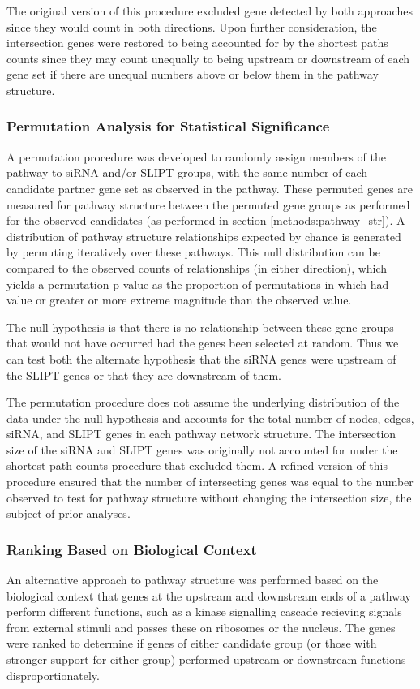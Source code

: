 The original version of this procedure excluded gene detected by both approaches since they would count in both directions. Upon further consideration, the intersection genes were restored to being accounted for by the shortest paths counts since they may count unequally to being upstream or downstream of each gene set if there are unequal numbers above or below them in the pathway structure.

\subsubsection{Permutation Analysis for Statistical Significance} \label{methods:network_permutation}
A permutation procedure was developed to randomly assign members of the pathway to siRNA and/or SLIPT groups, with the same number of each candidate partner gene set as observed in the pathway. These permuted genes are measured for pathway structure between the permuted gene groups as performed for the observed candidates (as performed in section \ref{methods:pathway_str}). A distribution of pathway structure relationships expected by chance is generated by permuting iteratively over these pathways. This null distribution can be compared to the observed counts of relationships (in either direction), which yields a permutation p-value as the proportion of permutations in which had value or greater or more extreme magnitude than the observed value.

The null hypothesis is that there is no relationship between these gene groups that would not have occurred had the genes been selected at random. Thus we can test both the alternate hypothesis that the siRNA genes were upstream of the SLIPT genes or that they are downstream of them.

The permutation procedure does not assume the underlying distribution of the data under the null hypothesis and accounts for the total number of nodes, edges, siRNA, and SLIPT genes in each pathway network structure. The intersection size of the siRNA and SLIPT genes was originally not accounted for under the shortest path counts procedure that excluded them. A refined version of this procedure ensured that the number of intersecting genes was equal to the number observed to test for pathway structure without changing the intersection size, the subject of prior analyses.

\subsubsection{Ranking Based on Biological Context} \label{methods:pathway_rank}
An alternative approach to pathway structure was performed based on the biological context that genes at the upstream and downstream ends of a pathway perform different functions, such as a kinase signalling cascade recieving signals from external stimuli and passes these on ribosomes or the nucleus. The genes were ranked to determine if genes of either candidate group (or those with stronger support for either group) performed upstream or downstream functions disproportionately.

